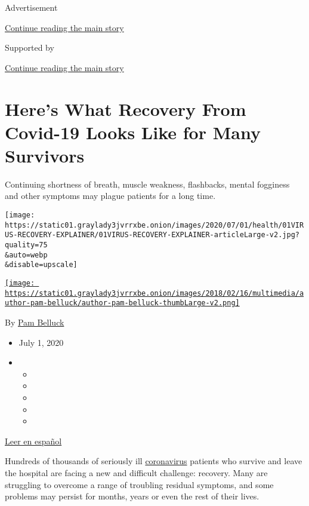 Advertisement

\protect\hyperlink{after-top}{Continue reading the main story}

Supported by

\protect\hyperlink{after-sponsor}{Continue reading the main story}

\hypertarget{heres-what-recovery-from-covid-19-looks-like-for-many-survivors}{%
\section{Here's What Recovery From Covid-19 Looks Like for Many
Survivors}\label{heres-what-recovery-from-covid-19-looks-like-for-many-survivors}}

Continuing shortness of breath, muscle weakness, flashbacks, mental
fogginess and other symptoms may plague patients for a long time.

\texttt{[image: https://static01.graylady3jvrrxbe.onion/images/2020/07/01/health/01VIRUS-RECOVERY-EXPLAINER/01VIRUS-RECOVERY-EXPLAINER-articleLarge-v2.jpg?quality=75\\\&auto=webp\\\&disable=upscale]}

\href{https://www.nytimes3xbfgragh.onion/by/pam-belluck}{\texttt{[image: https://static01.graylady3jvrrxbe.onion/images/2018/02/16/multimedia/author-pam-belluck/author-pam-belluck-thumbLarge-v2.png]}}

By \href{https://www.nytimes3xbfgragh.onion/by/pam-belluck}{Pam Belluck}

\begin{itemize}
\item
  July 1, 2020
\item
  \begin{itemize}
  \item
  \item
  \item
  \item
  \item
  \end{itemize}
\end{itemize}

\href{https://www.nytimes3xbfgragh.onion/es/2020/07/02/espanol/ciencia-y-tecnologia/sobrevivientes-coronavirus-recuperacion.html}{Leer
en español}

Hundreds of thousands of seriously ill
\href{https://www.nytimes3xbfgragh.onion/2020/07/22/health/coronavirus-isolation-testing.html}{coronavirus}
patients who survive and leave the hospital are facing a new and
difficult challenge: recovery. Many are struggling to overcome a range
of troubling residual symptoms, and some problems may persist for
months, years or even the rest of their lives.

